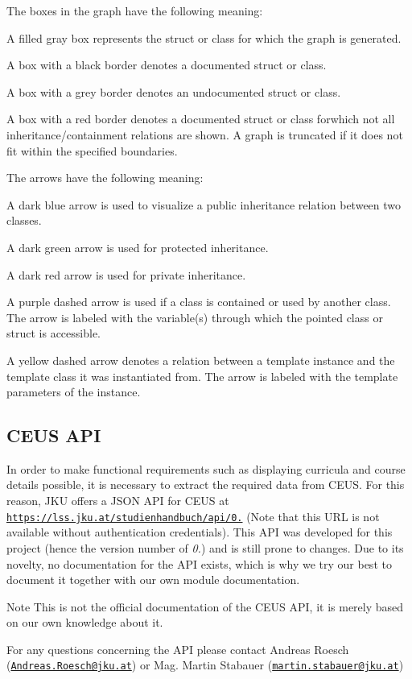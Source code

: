 The boxes in the graph have the following meaning\+:
\begin{DoxyItemize}
\item A filled gray box represents the struct or class for which the graph is generated.
\item A box with a black border denotes a documented struct or class.
\item A box with a grey border denotes an undocumented struct or class.
\item A box with a red border denotes a documented struct or class forwhich not all inheritance/containment relations are shown. A graph is truncated if it does not fit within the specified boundaries.
\end{DoxyItemize}

The arrows have the following meaning\+:
\begin{DoxyItemize}
\item A dark blue arrow is used to visualize a public inheritance relation between two classes.
\item A dark green arrow is used for protected inheritance.
\item A dark red arrow is used for private inheritance.
\item A purple dashed arrow is used if a class is contained or used by another class. The arrow is labeled with the variable(s) through which the pointed class or struct is accessible.
\item A yellow dashed arrow denotes a relation between a template instance and the template class it was instantiated from. The arrow is labeled with the template parameters of the instance.
\end{DoxyItemize}\hypertarget{index_ceusapi}{}\subsection{C\+E\+U\+S A\+P\+I}\label{index_ceusapi}
In order to make functional requirements such as displaying curricula and course details possible, it is necessary to extract the required data from C\+E\+U\+S. For this reason, J\+K\+U offers a J\+S\+O\+N A\+P\+I for C\+E\+U\+S at \href{https://lss.jku.at/studienhandbuch/api/0.1}{\tt https\+://lss.\+jku.\+at/studienhandbuch/api/0.} (Note that this U\+R\+L is not available without authentication credentials). This A\+P\+I was developed for this project (hence the version number of {\itshape 0.}) and is still prone to changes. Due to its novelty, no documentation for the A\+P\+I exists, which is why we try our best to document it together with our own module documentation. \begin{DoxyNote}{Note}
This is not the official documentation of the C\+E\+U\+S A\+P\+I, it is merely based on our own knowledge about it. 

For any questions concerning the A\+P\+I please contact Andreas Roesch (\href{mailto:Andreas.Roesch@jku.at}{\tt Andreas.\+Roesch@jku.\+at}) or Mag. Martin Stabauer (\href{mailto:martin.stabauer@jku.at}{\tt martin.\+stabauer@jku.\+at})
\end{DoxyNote}
